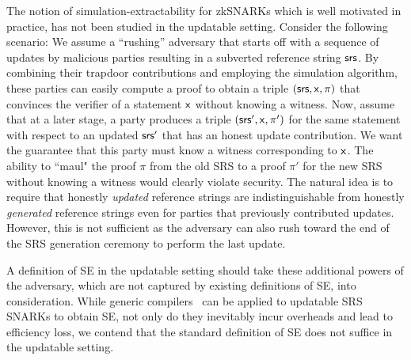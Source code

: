The notion of simulation-extractability for zkSNARKs which is well motivated in practice, has not been studied in the updatable setting.
Consider the following scenario: We assume a ``rushing'' adversary that starts off with a sequence of updates by malicious parties resulting in a subverted reference string $\mathsf{srs}$. By combining their trapdoor contributions and employing the simulation algorithm, these parties can easily compute a proof to obtain a triple $(\mathsf{srs},\mathsf{x},\pi)$  that convinces the verifier of a statement $\mathsf{x}$ without knowing a witness. Now, assume that at a later stage, a party produces a triple $(\mathsf{srs}',\mathsf{x},\pi')$ for the same statement with respect to an updated $\mathsf{srs}'$ that has an honest update contribution. We want the guarantee that this party must know a witness corresponding to $\mathsf{x}$. The ability to ``maul" the proof $\pi$ from the old SRS to a proof $\pi'$ for the new SRS without knowing a witness would clearly violate security. The natural idea is to require that honestly \emph{updated} reference strings are indistinguishable from honestly \emph{generated} reference strings even for parties that previously contributed updates. However, this is not sufficient as the adversary can also rush toward the end of the SRS generation ceremony to perform the last update.


A definition of SE in the updatable setting should take these additional powers of the adversary, which are not captured by existing definitions of SE, into consideration.
While generic compilers~\cite{EPRINT:KZMQCP15,CCS:AbdRamSla20} can be applied to updatable SRS SNARKs to obtain SE, not only do they inevitably incur overheads and lead to efficiency loss, we contend that the standard definition of SE does not suffice in the updatable setting.


